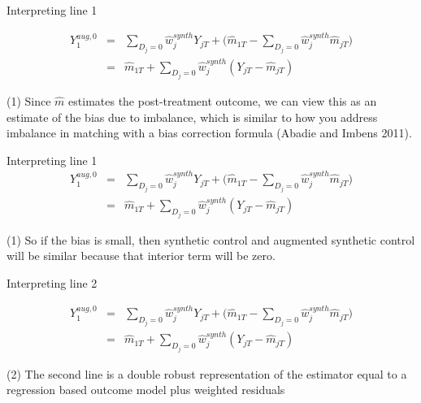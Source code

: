 \documentclass{beamer}
\begin{document}
\begin{frame}{Interpreting line 1}

\begin{eqnarray*}
Y_1^{aug,0}  &=& \sum_{D_j=0} \widehat{w}_j^{synth} Y_{jT} + \bigg (\widehat{m}_{1T} - \sum_{D_j=0} \widehat{w}_j^{synth}\widehat{m}_{jT} \bigg ) \\
&=& \widehat{m}_{1T} + \sum_{D_j=0} \widehat{w}_j^{synth} (Y_{jT} - \widehat{m}_{jT})
\end{eqnarray*}

(1) Since $\widehat{m}$ estimates the post-treatment outcome, we can view this as an estimate of the bias due to imbalance, which is similar to how you address imbalance in matching with a bias correction formula (Abadie and Imbens 2011). 

\end{frame}




\begin{frame}{Interpreting line 1}
\begin{eqnarray*}
Y_1^{aug,0}  &=& \sum_{D_j=0} \widehat{w}_j^{synth} Y_{jT} + \bigg (\widehat{m}_{1T} - \sum_{D_j=0} \widehat{w}_j^{synth}\widehat{m}_{jT} \bigg ) \\
&=& \widehat{m}_{1T} + \sum_{D_j=0} \widehat{w}_j^{synth} (Y_{jT} - \widehat{m}_{jT})
\end{eqnarray*}

(1) So if the bias is small, then synthetic control and augmented synthetic control will be similar because that interior term will be zero.

\end{frame}

\begin{frame}{Interpreting line 2}

\begin{eqnarray*}
Y_1^{aug,0}  &=& \sum_{D_j=0} \widehat{w}_j^{synth} Y_{jT} + \bigg (\widehat{m}_{1T} - \sum_{D_j=0} \widehat{w}_j^{synth}\widehat{m}_{jT} \bigg ) \\
&=& \widehat{m}_{1T} + \sum_{D_j=0} \widehat{w}_j^{synth} (Y_{jT} - \widehat{m}_{jT})
\end{eqnarray*}

(2) The second line is a double robust representation of the estimator equal to a regression based outcome model plus weighted residuals


\end{frame}
\end{document}
